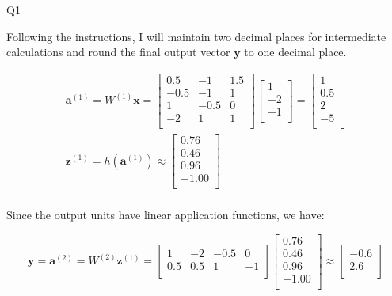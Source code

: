 \question Q1\droppoints

\begin{solution}
     Following the instructions, I will maintain two decimal places for intermediate calculations and round the final output vector $\mathbf{y}$ to one decimal place.

    \begin{gather*}
        \mathbf{a}^{(1)} = W^{(1)}\mathbf{x} =
        \begin{bmatrix}
            0.5  & -1   & 1.5 \\
            -0.5 & -1   & 1   \\
            1    & -0.5 & 0   \\
            -2   & 1    & 1   \\
        \end{bmatrix}
        \begin{bmatrix}
            1  \\
            -2 \\
            -1 \\
        \end{bmatrix}
        =
        \begin{bmatrix}
            1   \\
            0.5 \\
            2   \\
            -5  \\
        \end{bmatrix}\\
        \mathbf{z}^{(1)}
        = h(\mathbf{a}^{(1)})
        \approx
        \begin{bmatrix}
            0.76  \\
            0.46  \\
            0.96  \\
            -1.00 \\
        \end{bmatrix}\\
    \end{gather*}

    Since the output units have linear application functions, we have:

    \[
        \mathbf{y} = \mathbf{a}^{(2)}
        = W^{(2)}\mathbf{z}^{(1)}
        =
        \begin{bmatrix}
            1   & -2  & -0.5 & 0  \\
            0.5 & 0.5 & 1    & -1 \\
        \end{bmatrix}
        \begin{bmatrix}
            0.76  \\
            0.46  \\
            0.96  \\
            -1.00 \\
        \end{bmatrix}
        \approx
        \begin{bmatrix}
            -0.6 \\
            2.6  \\
        \end{bmatrix}
    \]


\end{solution}
